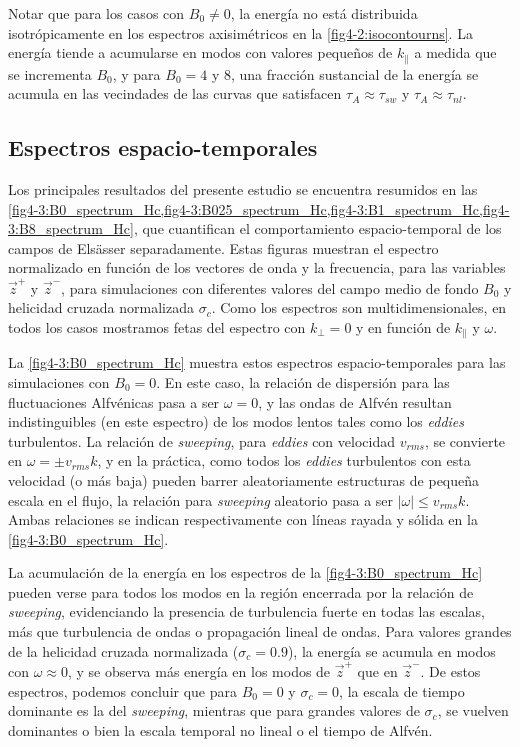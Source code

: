 Notar que para los casos con $B_0 \neq 0$, la energía no está
distribuida isotrópicamente en los espectros axisimétricos en la
\cref{fig4-2:isocontourns}. La energía tiende a acumularse en modos con
valores pequeños de $k_\parallel$ a medida que se incrementa $B_0$, y
para $B_0=4$ y $8$, una fracción sustancial de la energía se acumula
en las vecindades de las curvas que satisfacen
$\tau_A \approx \tau_{sw}$ y $\tau_A \approx \tau_{nl}$.


\subsection{Espectros espacio-temporales}\label{sec4:wk}

Los principales resultados del presente estudio se encuentra resumidos
en
las \cref{fig4-3:B0_spectrum_Hc,fig4-3:B025_spectrum_Hc,fig4-3:B1_spectrum_Hc,fig4-3:B8_spectrum_Hc},
que cuantifican el comportamiento espacio-temporal de los campos de
Els\"asser separadamente. Estas figuras muestran el espectro
normalizado en función de los vectores de onda y la frecuencia, para
las variables $\vec{z}^+$ y $\vec{z}^-$, para simulaciones con
diferentes valores del campo medio de fondo $B_0$ y helicidad cruzada
normalizada $\sigma_c$. Como los espectros son multidimensionales, en
todos los casos mostramos fetas del espectro con $k_\perp=0$ y en
función de $k_\parallel$ y $\omega$.

La \cref{fig4-3:B0_spectrum_Hc} muestra estos espectros
espacio-temporales para las simulaciones con $B_0=0$. En este caso, la
relación de dispersión para las fluctuaciones Alfvénicas pasa a ser
$\omega=0$, y las ondas de Alfvén resultan indistinguibles (en este
espectro) de los modos lentos tales como los \textit{eddies}
turbulentos. La relación de \textit{sweeping}, para \textit{eddies} con
velocidad $v_{rms}$, se convierte en $\omega=\pm v_{rms} k$, y en la
práctica, como todos los \textit{eddies} turbulentos con esta
velocidad (o más baja) pueden barrer aleatoriamente estructuras de
pequeña escala en el flujo, la relación para \textit{sweeping} aleatorio pasa
a ser $|\omega| \leq v_{rms} k$. Ambas relaciones se indican
respectivamente con líneas rayada y sólida en la
\cref{fig4-3:B0_spectrum_Hc}.

La acumulación de la energía en los espectros de la
\cref{fig4-3:B0_spectrum_Hc} pueden verse para todos los modos en la
región encerrada por la relación de \textit{sweeping}, evidenciando la
presencia de turbulencia fuerte en todas las escalas, más que
turbulencia de ondas o propagación lineal de ondas. Para valores
grandes de la helicidad cruzada normalizada ($\sigma_c = 0.9$), la
energía se acumula en modos con $\omega\approx 0$, y se observa más
energía en los modos de $\vec{z}^+$ que en $\vec{z}^-$. De estos
espectros, podemos concluir que para $B_0=0$ y $\sigma_c=0$, la escala
de tiempo dominante es la del \textit{sweeping}, mientras que para grandes
valores de $\sigma_c$, se vuelven dominantes o bien la escala temporal
no lineal o el tiempo de Alfvén.

